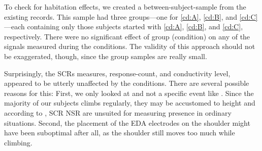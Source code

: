 To check for habitation effects, we created a between-subject-sample from the existing records. This sample had three groups---one for \ref{cd:A}, \ref{cd:B}, and \ref{cd:C}---each containing only those subjects started with \ref{cd:A}, \ref{cd:B}, and \ref{cd:C}, respectively. There were no significant effect of group (condition) on any of the signals measured during the conditions. The validity of this approach should not be exaggerated, though, since the group samples are really small.

Surprisingly, the \glspl{SCR} measures, response-count, and conductivity level, appeared to be utterly unaffected by the conditions. There are several possible reasons for this: First, we only looked at  and not a specific event like \textcite{Brouwer2014, Insko2001}. Since the majority of our subjects climbs regularly, they may be accustomed to height and according to \textcite[]{Slater2007}, \gls{SCR} \gls{NSR} are unsuited for measuring presence in ordinary situations. Second, the placement of the \gls{EDA} electrodes on the shoulder might have been suboptimal after all, as the shoulder still moves too much while climbing.